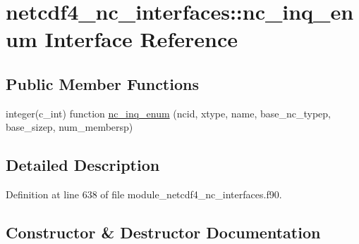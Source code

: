 \hypertarget{interfacenetcdf4__nc__interfaces_1_1nc__inq__enum}{}\section{netcdf4\+\_\+nc\+\_\+interfaces\+:\+:nc\+\_\+inq\+\_\+enum Interface Reference}
\label{interfacenetcdf4__nc__interfaces_1_1nc__inq__enum}
\subsection*{Public Member Functions}
\begin{DoxyCompactItemize}
\item 
integer(c\+\_\+int) function \hyperlink{interfacenetcdf4__nc__interfaces_1_1nc__inq__enum_a03dc32593587c9b818679c796b78beea}{nc\+\_\+inq\+\_\+enum} (ncid, xtype, name, base\+\_\+nc\+\_\+typep, base\+\_\+sizep, num\+\_\+membersp)
\end{DoxyCompactItemize}


\subsection{Detailed Description}


Definition at line 638 of file module\+\_\+netcdf4\+\_\+nc\+\_\+interfaces.\+f90.



\subsection{Constructor \& Destructor Documentation}
\mbox{\label{interfacenetcdf4__nc__interfaces_1_1nc__inq__enum_a03dc32593587c9b818679c796b78beea}} 
